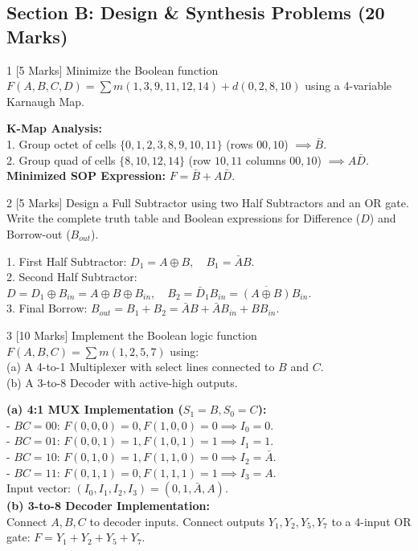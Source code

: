 \subsection*{Section B: Design \& Synthesis Problems (20 Marks)}

\begin{examqbox}{1 [5 Marks]}
Minimize the Boolean function $F(A,B,C,D) = \sum m(1,3,9,11,12,14) + d(0,2,8,10)$ using a 4-variable Karnaugh Map.
\end{examqbox}

\begin{solbox}
\textbf{K-Map Analysis:}\\
1. Group octet of cells $\{0, 1, 2, 3, 8, 9, 10, 11\}$ (rows $00, 10$) $\implies \bar{B}$.\\
2. Group quad of cells $\{8, 10, 12, 14\}$ (row $10, 11$ columns $00, 10$) $\implies A\bar{D}$.\\
\textbf{Minimized SOP Expression:} $F = \bar{B} + A\bar{D}$.
\end{solbox}

\begin{examqbox}{2 [5 Marks]}
Design a Full Subtractor using two Half Subtractors and an OR gate. Write the complete truth table and Boolean expressions for Difference ($D$) and Borrow-out ($B_{out}$).
\end{examqbox}

\begin{solbox}
1. First Half Subtractor: $D_1 = A \oplus B, \quad B_1 = \bar{A}B$.\\
2. Second Half Subtractor: $D = D_1 \oplus B_{in} = A \oplus B \oplus B_{in}, \quad B_2 = \bar{D}_1 B_{in} = \overline{(A \oplus B)} B_{in}$.\\
3. Final Borrow: $B_{out} = B_1 + B_2 = \bar{A}B + \bar{A}B_{in} + BB_{in}$.
\end{solbox}

\begin{examqbox}{3 [10 Marks]}
Implement the Boolean logic function $F(A,B,C) = \sum m(1,2,5,7)$ using:\\
(a) A 4-to-1 Multiplexer with select lines connected to $B$ and $C$.\\
(b) A 3-to-8 Decoder with active-high outputs.
\end{examqbox}

\begin{solbox}
\textbf{(a) 4:1 MUX Implementation ($S_1=B, S_0=C$):}\\
- $BC = 00$: $F(0,0,0)=0, F(1,0,0)=0 \implies I_0 = 0$.\\
- $BC = 01$: $F(0,0,1)=1, F(1,0,1)=1 \implies I_1 = 1$.\\
- $BC = 10$: $F(0,1,0)=1, F(1,1,0)=0 \implies I_2 = \bar{A}$.\\
- $BC = 11$: $F(0,1,1)=0, F(1,1,1)=1 \implies I_3 = A$.\\
Input vector: $(I_0, I_1, I_2, I_3) = (0, 1, \bar{A}, A)$.\\
\textbf{(b) 3-to-8 Decoder Implementation:}\\
Connect $A,B,C$ to decoder inputs. Connect outputs $Y_1, Y_2, Y_5, Y_7$ to a 4-input OR gate: $F = Y_1 + Y_2 + Y_5 + Y_7$.
\end{solbox}
